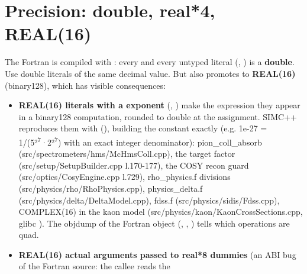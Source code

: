 \section{\texorpdfstring{Precision: double, real*4, REAL(16)}{Precision: double, real*4, REAL(16)}}\label{translation_report-04u5fnumerics:42-precision-double-real4-real16}
The Fortran is compiled with : every  and every untyped literal (, ) is
a \textbf{double}. Use double literals of the same decimal value. But  also promotes 
to \textbf{REAL(16)} (binary128),\allowbreak{} which has visible consequences:

\begin{itemize}
\item \textbf{REAL(16) literals with a  exponent} (, ) make the expression they appear in a binary128
computation,\allowbreak{} rounded to double at the assignment. SIMC++ reproduces them with  (), building the constant exactly (e.g. 1e-27 = 1/\allowbreak{}(5²\textsuperscript{7}·2²\textsuperscript{7}) with an exact integer denominator):
pion\_\allowbreak{}coll\_\allowbreak{}absorb (src/\allowbreak{}spectrometers/\allowbreak{}hms/\allowbreak{}McHmsColl.\allowbreak{}cpp),\allowbreak{} the target factor (src/\allowbreak{}setup/\allowbreak{}SetupBuilder.\allowbreak{}cpp l.170-177),
the COSY recon guard (src/\allowbreak{}optics/\allowbreak{}CosyEngine.\allowbreak{}cpp l.729), rho\_\allowbreak{}physics.\allowbreak{}f divisions (src/\allowbreak{}physics/\allowbreak{}rho/\allowbreak{}RhoPhysics.\allowbreak{}cpp),\allowbreak{}
physics\_\allowbreak{}delta.\allowbreak{}f (src/\allowbreak{}physics/\allowbreak{}delta/\allowbreak{}DeltaModel.\allowbreak{}cpp),\allowbreak{} fdss.f (src/\allowbreak{}physics/\allowbreak{}sidis/\allowbreak{}Fdss.\allowbreak{}cpp),\allowbreak{} COMPLEX(16) in the kaon
model (src/\allowbreak{}physics/\allowbreak{}kaon/\allowbreak{}KaonCrossSections.\allowbreak{}cpp,\allowbreak{} glibc ). The objdump of the Fortran object
(, , ) tells which operations are quad.
\item \textbf{REAL(16) actual arguments passed to real*8 dummies} (an ABI bug of the Fortran source: the callee reads the

\end{itemize}
